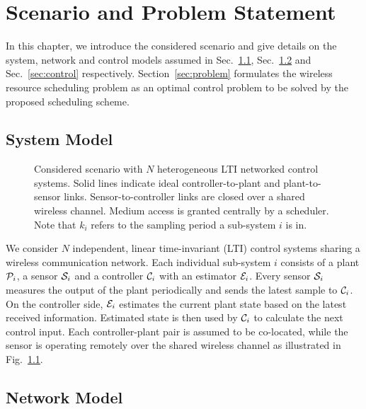 \chapter{Scenario and Problem Statement}

In this chapter, we introduce the considered scenario and give details on the
system, network and control models assumed in Sec.~\ref{sec:system},
Sec.~\ref{sec:network} and Sec.~\ref{sec:control} respectively.
Section~\ref{sec:problem} formulates the wireless resource scheduling problem as
an optimal control problem to be solved by the proposed scheduling scheme.

\section{System Model} \label{sec:system} 

\begin{figure}[htb]
  \centering
  \resizebox*{.8\textwidth}{!}{} 
  \caption[Scheme of $N$ sub-systems sharing a wireless communication
  medium]{Considered scenario with $N$ heterogeneous LTI networked control
  systems. Solid lines indicate ideal controller-to-plant and plant-to-sensor
  links. Sensor-to-controller links are closed over a shared wireless channel.
  Medium access is granted centrally by a scheduler. Note that $k_i$ refers to
  the sampling period a sub-system $i$ is in.}
  \label{fig:scenario}
\end{figure}

We consider $N$ independent, linear time-invariant (LTI) control systems sharing
a wireless communication network. Each individual sub-system $i$ consists of a
plant $\mathcal{P}_i$, a sensor $\mathcal{S}_i$ and a controller $\mathcal{C}_i$ with an
estimator $\mathcal{E}_i$. Every sensor $\mathcal{S}_i$ measures the output of the plant
periodically and sends the latest sample to $\mathcal{C}_i$. On the controller
side, $\mathcal{E}_i$ estimates the current plant state based on the latest
received information. Estimated state is then used by $\mathcal{C}_i$ to calculate
the next control input. Each controller-plant pair is assumed to be co-located,
while the sensor is operating remotely over the shared wireless channel as
illustrated in Fig.~\ref{fig:scenario}.

\section{Network Model} \label{sec:network} 

